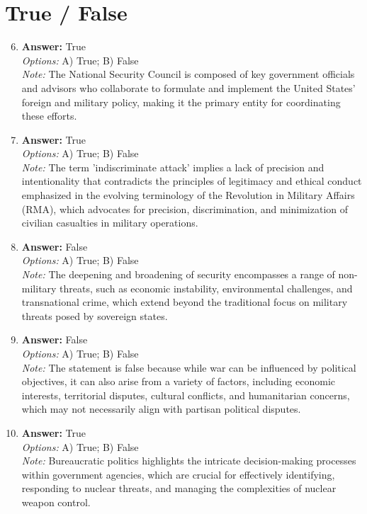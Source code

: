 \documentclass[12pt]{article}
\begin{document}
\section*{True / False}
\begin{enumerate}[label=\arabic*.]
\setcounter{enumi}{5}
\item \textbf{Answer:} True
\\ \textit{Options:} A) True; B) False
\\ \textit{Note:} The National Security Council is composed of key government officials and advisors who collaborate to formulate and implement the United States' foreign and military policy, making it the primary entity for coordinating these efforts.
\item \textbf{Answer:} True
\\ \textit{Options:} A) True; B) False
\\ \textit{Note:} The term 'indiscriminate attack' implies a lack of precision and intentionality that contradicts the principles of legitimacy and ethical conduct emphasized in the evolving terminology of the Revolution in Military Affairs (RMA), which advocates for precision, discrimination, and minimization of civilian casualties in military operations.
\item \textbf{Answer:} False
\\ \textit{Options:} A) True; B) False
\\ \textit{Note:} The deepening and broadening of security encompasses a range of non-military threats, such as economic instability, environmental challenges, and transnational crime, which extend beyond the traditional focus on military threats posed by sovereign states.
\item \textbf{Answer:} False
\\ \textit{Options:} A) True; B) False
\\ \textit{Note:} The statement is false because while war can be influenced by political objectives, it can also arise from a variety of factors, including economic interests, territorial disputes, cultural conflicts, and humanitarian concerns, which may not necessarily align with partisan political disputes.
\item \textbf{Answer:} True
\\ \textit{Options:} A) True; B) False
\\ \textit{Note:} Bureaucratic politics highlights the intricate decision-making processes within government agencies, which are crucial for effectively identifying, responding to nuclear threats, and managing the complexities of nuclear weapon control.
\end{enumerate}
\end{document}
